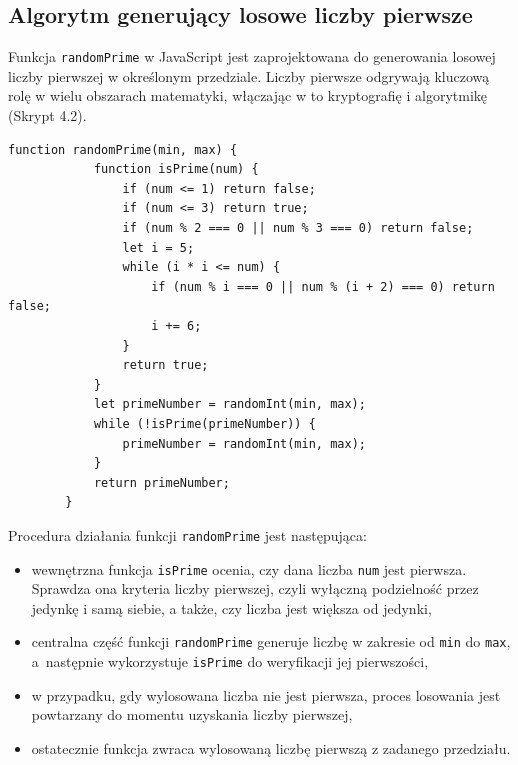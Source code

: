 \documentclass{SGGW-thesis}
\begin{document}
	\subsection{Algorytm generujący losowe liczby pierwsze}
	Funkcja \texttt{randomPrime} w JavaScript jest zaprojektowana do generowania losowej liczby pierwszej w określonym przedziale. Liczby pierwsze odgrywają kluczową rolę w wielu obszarach matematyki, włączając w to kryptografię i algorytmikę (Skrypt 4.2).
	\vspace{1em}
	\begin{lstlisting}[caption=Funkcja w JavaScript do generowania liczb pierwszych]
		function randomPrime(min, max) {
			function isPrime(num) {
				if (num <= 1) return false;
				if (num <= 3) return true;
				if (num % 2 === 0 || num % 3 === 0) return false;
				let i = 5;
				while (i * i <= num) {
					if (num % i === 0 || num % (i + 2) === 0) return false;
					i += 6;
				}
				return true;
			}
			let primeNumber = randomInt(min, max);
			while (!isPrime(primeNumber)) {
				primeNumber = randomInt(min, max);
			}
			return primeNumber;
		}
	\end{lstlisting}
	\vspace{1em}
	Procedura działania funkcji \texttt{randomPrime} jest następująca:
	\begin{itemize}
		\item wewnętrzna funkcja \texttt{isPrime} ocenia, czy dana liczba \texttt{num} jest pierwsza. Sprawdza ona kryteria liczby pierwszej, czyli wyłączną podzielność przez jedynkę i samą siebie, a także, czy liczba jest większa od jedynki,
		\item centralna część funkcji \texttt{randomPrime} generuje liczbę w zakresie od \texttt{min} do \texttt{max}, a~następnie wykorzystuje \texttt{isPrime} do weryfikacji jej pierwszości,
		\item w przypadku, gdy wylosowana liczba nie jest pierwsza, proces losowania jest powtarzany do momentu uzyskania liczby pierwszej,
		\item ostatecznie funkcja zwraca wylosowaną liczbę pierwszą z zadanego przedziału.
	\end{itemize}
	\newpage
	
\end{document}
